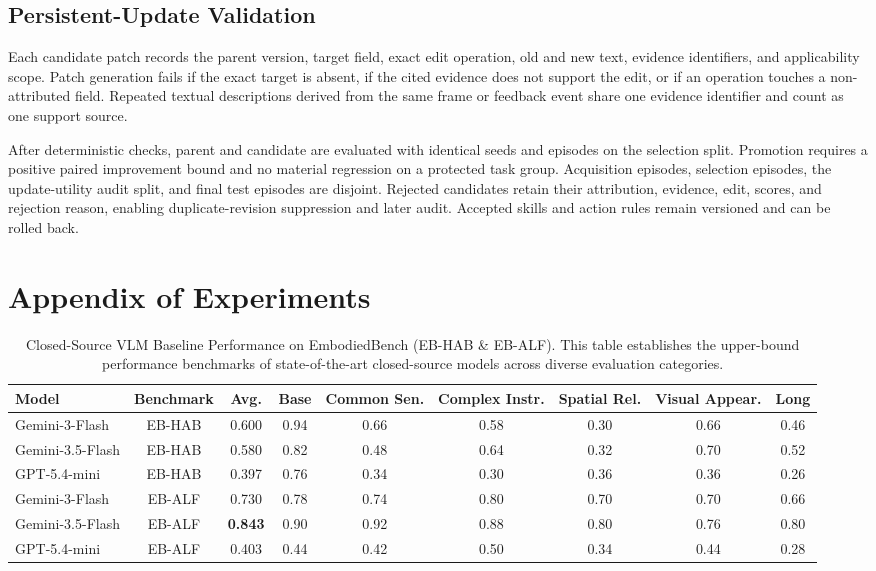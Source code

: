 \subsection{Persistent-Update Validation}
\label{sec:update_validation}

Each candidate patch records the parent version, target field, exact edit operation, old and new text, evidence identifiers, and applicability scope. Patch generation fails if the exact target is absent, if the cited evidence does not support the edit, or if an operation touches a non-attributed field. Repeated textual descriptions derived from the same frame or feedback event share one evidence identifier and count as one support source.

After deterministic checks, parent and candidate are evaluated with identical seeds and episodes on the selection split. Promotion requires a positive paired improvement bound and no material regression on a protected task group. Acquisition episodes, selection episodes, the update-utility audit split, and final test episodes are disjoint. Rejected candidates retain their attribution, evidence, edit, scores, and rejection reason, enabling duplicate-revision suppression and later audit. Accepted skills and action rules remain versioned and can be rolled back.


\section{Appendix of Experiments}

\begin{table}[t]
    \centering
    \caption{Closed-Source VLM Baseline Performance on EmbodiedBench (EB-HAB \& EB-ALF). This table establishes the upper-bound performance benchmarks of state-of-the-art closed-source models across diverse evaluation categories.}
    \label{tab:closed_source_baselines}
    \small
    \begin{tabular}{lcccccccc}
        \toprule
        \textbf{Model} & \textbf{Benchmark} & \textbf{Avg.} & \textbf{Base} & \textbf{Common Sen.} & \textbf{Complex Instr.} & \textbf{Spatial Rel.} & \textbf{Visual Appear.} & \textbf{Long} \\
        \midrule
        Gemini-3-Flash & EB-HAB & 0.600 & 0.94 & 0.66 & 0.58 & 0.30 & 0.66 & 0.46 \\
        Gemini-3.5-Flash & EB-HAB & 0.580 & 0.82 & 0.48 & 0.64 & 0.32 & 0.70 & 0.52 \\
        GPT-5.4-mini & EB-HAB & 0.397 & 0.76 & 0.34 & 0.30 & 0.36 & 0.36 & 0.26 \\
        \midrule
        Gemini-3-Flash & EB-ALF & 0.730 & 0.78 & 0.74 & 0.80 & 0.70 & 0.70 & 0.66 \\
        Gemini-3.5-Flash & EB-ALF & \textbf{0.843} & 0.90 & 0.92 & 0.88 & 0.80 & 0.76 & 0.80 \\
        GPT-5.4-mini & EB-ALF & 0.403 & 0.44 & 0.42 & 0.50 & 0.34 & 0.44 & 0.28 \\
        \bottomrule
    \end{tabular}
\end{table}


